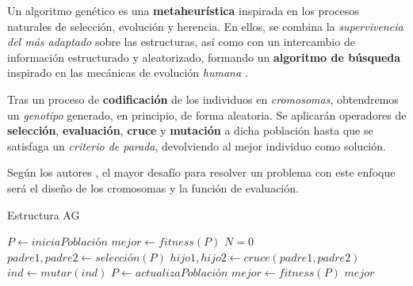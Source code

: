 Un algoritmo genético es una \textbf{metaheurística} inspirada en los procesos naturales de selección, evolución y herencia. En ellos, se combina la \textit{supervivencia del más adaptado} sobre las estructuras, así como con un intercambio de información estructurado y aleatorizado, formando un \textbf{algoritmo de búsqueda} inspirado en las mecánicas de evolución \textit{humana}   \cite{Goldberg1989GeneticLearning}.


Tras un proceso de \textbf{codificación} de los individuos en \textit{cromosomas}, obtendremos un \textit{genotipo} generado, en principio, de forma aleatoria. Se aplicarán operadores de \textbf{selección}, \textbf{evaluación}, \textbf{cruce} y \textbf{mutación} a dicha población hasta que se satisfaga un \textit{criterio de parada}, devolviendo al mejor individuo como solución.

Según los autores \cite{Lin2020AScheduling,Goldberg1989GeneticLearning}, el mayor desafío para resolver un problema con este enfoque será el diseño de los cromosomas y la función de evaluación.

\begin{algorithm}
\caption{Estructura AG}\label{alg:ag}
\begin{algorithmic}
\State $P \gets iniciaPoblación$
\State $mejor \gets fitness(P)$
\State $N = 0$
\State $padre1,padre2 \gets selección(P)$
\State $hijo1,hijo2 \gets cruce(padre1,padre2)$
\EndIf
{}
\State $ind \gets mutar(ind)$
\EndIf
\State $P \gets actualizaPoblación$
\State $mejor \gets fitness(P)$
\EndWhile
\State \Return $mejor$
\end{algorithmic}
\end{algorithm}

